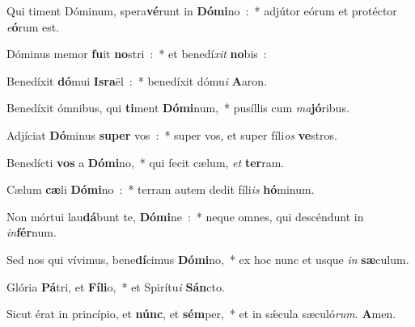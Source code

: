 \item Qui timent Dóminum, spera\textbf{vé}\-runt in \textbf{Dó}\-\textbf{mi}\-no~:~* adjútor eórum et protéctor \emph{e}\-\textbf{ó}\-rum est.
\item Dóminus memor \textbf{fu}\-it \textbf{no}\-stri~:~* et benedí\emph{xit} \textbf{no}bis~:
\item Benedíxit \textbf{dó}\-mui \textbf{Is}\-\textbf{ra}\-ël~:~* benedíxit dómu\emph{i} \textbf{A}aron.
\item Benedíxit ómnibus, qui \textbf{ti}\-ment \textbf{Dó}\-\textbf{mi}\-num,~* pusíllis cum \emph{ma}\textbf{jó}ribus.
\item Adjíciat \textbf{Dó}\-minus \textbf{su}\-\textbf{per} vos~:~* super vos, et super fí\-li\-\emph{os} \textbf{ve}stros.
\item Benedícti \textbf{vos} a \textbf{Dó}\-\textbf{mi}\-no,~* qui fecit cælum, \emph{et} \textbf{ter}ram.
\item Cælum \textbf{cæ}\-li \textbf{Dó}\-\textbf{mi}\-no~:~* terram autem dedit fíli\emph{is} \textbf{hó}\-mi\-num.
\item Non mórtui lau\textbf{dá}\-bunt te, \textbf{Dó}\-\textbf{mi}\-ne~:~* neque omnes, qui descéndunt in \emph{in}\textbf{fér}num.
\item Sed nos qui vívimus, bene\textbf{dí}\-cimus \textbf{Dó}\-\textbf{mi}\-no,~* ex hoc nunc et usque \emph{in} \textbf{sæ}culum.
\item Glória \textbf{Pá}\-tri, et \textbf{Fí}\-\textbf{li}\-o,~* et Spirítu\emph{i} \textbf{Sán}cto.
\item Sicut érat in princípio, et \textbf{núnc}, et \textbf{sém}\-per,~* et in sǽcula sæculó\emph{rum}. \textbf{A}men.
